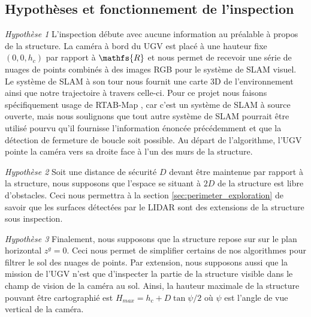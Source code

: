 
\subsection{Hypothèses et fonctionnement de l'inspection}
\label{sec:ugv_hypothesis}

\textit{Hypothèse 1} L'inspection débute avec aucune information au préalable à propos de la structure. La caméra à bord du UGV est placé à une hauteur fixe $(0,0,h_c)$ par rapport à $\mathfs{R}$ et nous permet de recevoir une série de nuages de points combinés à des images RGB pour le système de SLAM visuel. Le système de SLAM à son tour nous fournit une carte 3D de l'environnement ainsi que notre trajectoire à travers celle-ci. Pour ce projet nous faisons spécifiquement usage de RTAB-Map \citep{Labbe2014}, car c'est un système de SLAM à source ouverte, mais nous soulignons que tout autre système de SLAM pourrait être utilisé pourvu qu'il fournisse l'information énoncée précédemment et que la détection de fermeture de boucle soit possible. Au départ de l'algorithme, l'UGV pointe la caméra vers sa droite face à l'un des murs de la structure.

\textit{Hypothèse 2} Soit une distance de sécurité $D$ devant être maintenue par rapport à la structure, nous supposons que l'espace se situant à $2D$ de la structure est libre d'obstacles. Ceci nous permettra à la section \ref{sec:perimeter_exploration} de savoir que les surfaces détectées par le LIDAR sont des extensions de la structure sous inspection.

\textit{Hypothèse 3} Finalement, nous supposons que la structure repose sur sur le plan horizontal $z^g = 0$. Ceci nous permet de simplifier certains de nos algorithmes pour filtrer le sol des nuages de points. Par extension, nous supposons aussi que la mission de l'UGV n'est que d'inspecter la partie de la structure visible dans le champ de vision de la caméra au sol. Ainsi, la hauteur maximale de la structure pouvant être cartographié est $H_{max} = h_c + D \tan{\psi/2}$ où $\psi$ est l'angle de vue vertical de la caméra.

